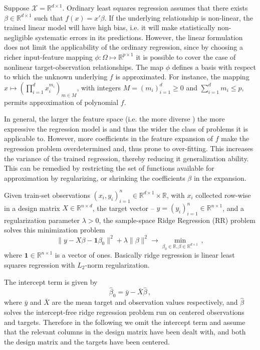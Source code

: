 \documentclass[a4paper,14pt]{extarticle}
\newcommand{\Xcal}{\mathcal{X}}
\newcommand{\Real}{\mathbb{R}}
\newcommand{\one}{\mathbf{1}}
\begin{document}
Suppose $\Xcal = \Real^{d\times 1}$. Ordinary least squares regression assumes that
there exists $\beta\in \Real^{d\times 1}$ such that $f(x) = x'\beta$. If the underlying
relationship is non-linear, the trained linear model will have high bias, i.e.
it will make statistically non-negligible systematic errors in its predictions.
However, the linear formulation does not limit the applicability of the ordinary
regression, since by choosing a richer input-feature mapping $\phi: \Omega \mapsto
\Real^{p\times 1}$ it is possible to cover the case of nonlinear target-observation
relationships. The map $\phi$ defines a basis with respect to which the unknown
underlying $f$ is approximated. For instance, the mapping $x\mapsto (\prod_{i=1}^d
x_i^{m_i})_{m\in M}$, with integers $M=(m_i)_{i=1}^d\geq 0$ and $\sum_{i=1}^d m_i \leq p$,
permits approximation of polynomial $f$.

In general, the larger the feature space (i.e. the more diverse ) the more expressive
the regression model is and thus the wider the class of problems it is applicable
to. However, more coefficients in the feature expansion of $f$ make the regression
problem overdetermined and, thus prone to over-fitting. This increases the variance
of the trained regression, thereby reducing it generalization ability. This can be
remedied by restricting the set of functions available for approximation by regularizing,
or shrinking the coefficients $\beta$ in the expansion.

Given train-set observations $(x_i, y_i)_{i=1}^n \in \Real^{d\times 1}\times \Real$,
with $x_i$ collected row-wise in a design matrix $X\in \Real^{n\times d}$, the target
vector -- $y=(y_i)_{i=1}^n \in \Real^{n\times 1}$, and a regularization parameter
$\lambda > 0$, the sample-space Ridge Regression (RR) problem solves this minimization
problem
\begin{equation}
  \| y - X\beta - \one\beta_0 \|^2 + \lambda \|\beta\|^2
    \to \min_{\beta_0\in \Real, \beta \in \Real^{d\times 1}} \,,
\end{equation}
where $\one \in \Real^{n\times 1}$ is a vector of ones. Basically ridge regression
is linear least squares regression with $L_2$-norm regularization.

The intercept term is given by
\begin{equation}
  \hat{\beta}_0 = \bar{y} - \bar{X} \hat{\beta} \,,
\end{equation}
where $\bar{y}$ and $\bar{X}$ are the mean target and observation values respectively,
and $\hat{\beta}$ solves the intercept-free ridge regression problem run on centered
observations and targets. Therefore in the following we omit the intercept term and
assume that the relevant columns in the design matrix have been dealt with, and both
the design matrix and the targets have been centered.
\end{document}
